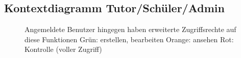 \documentclass[10pt,a4paper]{scrartcl}
\begin{document}
\subsection{Kontextdiagramm Tutor/Schüler/Admin}
\begin{figure}[!htbp]
\caption{Angemeldete Benutzer hingegen haben erweiterte Zugriffsrechte auf diese Funktionen
\newline Grün: erstellen, bearbeiten
\newline Orange: ansehen
\newline Rot: Kontrolle (voller Zugriff)} 
\end{figure}

\end{document}
